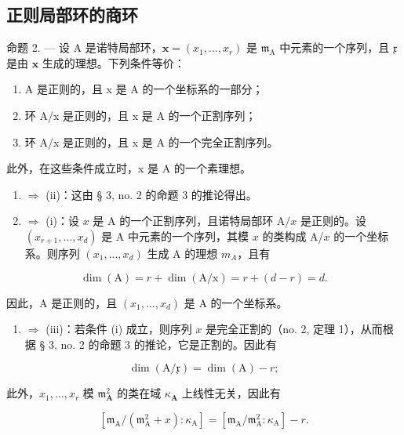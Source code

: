 \subsection{正则局部环的商环}

命题 2. --- 设 A 是诺特局部环，\(\boldsymbol{x} = (x_1, ..., x_r)\) 是 \(\mathfrak{m}_{\mathrm{A}}\) 中元素的一个序列，且 \(\mathfrak{x}\) 是由 \(\boldsymbol{x}\) 生成的理想。下列条件等价：

\begin{enumerate}
\def\labelenumi{(\roman{enumi})}
\item
  A 是正则的，且 x 是 A 的一个坐标系的一部分；
\item
  环 A/x 是正则的，且 x 是 A 的一个正割序列；
\item
  环 A/x 是正则的，且 x 是 A 的一个完全正割序列。
\end{enumerate}

此外，在这些条件成立时，x 是 A 的一个素理想。

\begin{enumerate}
\def\labelenumi{(\roman{enumi})}
\setcounter{enumi}{2}
\item
  \(\Rightarrow\) (ii)：这由 § 3, no. 2 的命题 3 的推论得出。
\item
  \(\Rightarrow\) (i)：设 \(x\) 是 A 的一个正割序列，且诺特局部环 A/\(x\) 是正则的。设 \((x_{r+1}, ..., x_d)\) 是 A 中元素的一个序列，其模 \(x\) 的类构成 A/\(x\) 的一个坐标系。则序列 \((x_1, ..., x_d)\) 生成 A 的理想 \(m_A\)，且有
\end{enumerate}

\[
\dim (\mathrm{A}) = r + \dim (\mathrm{A} / \mathrm{x}) = r + (d - r) = d.
\]

因此，A 是正则的，且 \((x_{1},\ldots,x_{d})\) 是 A 的一个坐标系。

\begin{enumerate}
\def\labelenumi{(\roman{enumi})}
\tightlist
\item
  \(\Rightarrow\) (iii)：若条件 (i) 成立，则序列 \(x\) 是完全正割的（no. 2, 定理 1），从而根据 § 3, no. 2 的命题 3 的推论，它是正割的。因此有
\end{enumerate}

\[
\dim (\mathrm{A} / \mathfrak {x}) = \dim (\mathrm{A}) - r;\tag{3}
\]

此外，\(x_{1},\ldots,x_{r}\) 模 \(\mathfrak{m}_{\mathbf{A}}^{2}\) 的类在域 \(\kappa_{\mathbf{A}}\) 上线性无关，因此有

\[
\left[ \mathfrak {m} _ {\mathrm{A}} / (\mathfrak {m} _ {\mathrm{A}} ^ {2} + x): \kappa_ {\mathrm{A}} \right] = \left[ \mathfrak {m} _ {\mathrm{A}} / \mathfrak {m} _ {\mathrm{A}} ^ {2}: \kappa_ {\mathrm{A}} \right] - r.\tag{4}
\]

